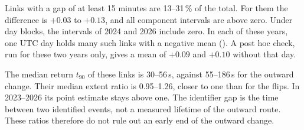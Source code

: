 Links with a gap of at least 15 minutes are 13--31\,\% of the total.
For them the difference is $+0.03$ to $+0.13$, and all component intervals are above zero.
Under day blocks, the intervals of 2024 and 2026 include zero.
In each of these years, one UTC day holds many such links with a negative mean ().
A post hoc check, run for these two years only, gives a mean of $+0.09$ and $+0.10$ without that day.

The median return $t_{90}$ of these links is 30--56\,s, against 55--186\,s for the outward change.
Their median extent ratio is 0.95--1.26, closer to one than for the flips.
In 2023--2026 its point estimate stays above one.
The identifier gap is the time between two identified events, not a measured lifetime of the outward route.
These ratios therefore do not rule out an early end of the outward change.

